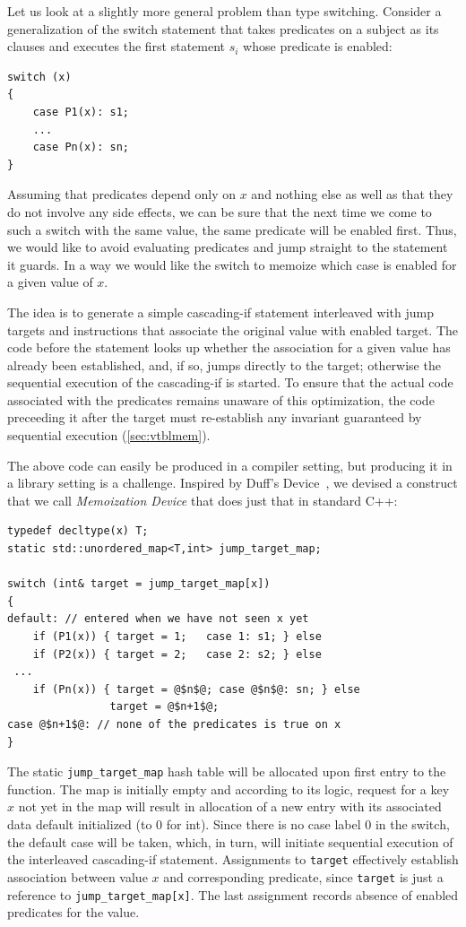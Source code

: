\documentclass[preprint]{sigplanconf}
\makeatletter
\DeclareRobustCommand{\code}[1]{{\lstinline[breaklines=false,escapechar=@]{#1}}}
\makeatother
\begin{document}
Let us look at a slightly more general problem than type switching. Consider a 
generalization of the switch statement that takes predicates on a subject as its 
clauses and executes the first statement $s_i$ whose predicate is enabled: 

\begin{lstlisting}
switch (x)
{
    case P1(x): s1;
    ...
    case Pn(x): sn;
}
\end{lstlisting}

\noindent
Assuming that predicates depend only on $x$ and nothing else as well as that 
they do not involve any side effects, we can be sure that the next time we come 
to such a switch with the same value, the same predicate will be enabled 
first. Thus, we would like to avoid evaluating predicates and jump straight to 
the statement it guards. In a way we would like the switch to  memoize which 
case is enabled for a given value of $x$.

The idea is to generate a simple cascading-if statement interleaved with jump 
targets and instructions that associate the original value with enabled target. 
The code before the statement looks up whether the association for a given value 
has already been established, and, if so, jumps directly to the target; otherwise 
the sequential execution of the cascading-if is started. To ensure 
that the actual code associated with the predicates remains unaware of this 
optimization, the code preceeding it after the target must re-establish any 
invariant guaranteed by sequential execution (\textsection\ref{sec:vtblmem}).

The above code can easily be produced in a compiler setting, but producing it in 
a library setting is a challenge. Inspired by Duff's Device~\cite{Duff}, 
we devised a construct that we call \emph{Memoization Device} that does just 
that in standard C++:

\begin{lstlisting}
typedef decltype(x) T;
static std::unordered_map<T,int> jump_target_map;

switch (int& target = jump_target_map[x])
{
default: // entered when we have not seen x yet
    if (P1(x)) { target = 1;   case 1: s1; } else 
    if (P2(x)) { target = 2;   case 2: s2; } else
 ...
    if (Pn(x)) { target = @$n$@; case @$n$@: sn; } else
                target = @$n+1$@;
case @$n+1$@: // none of the predicates is true on x
}
\end{lstlisting}

\noindent
The static \code{jump_target_map} hash table will be allocated upon first entry 
to the function. The map is initially empty and according to its logic, 
request for a key $x$ not yet in the map will result in allocation of a 
new entry with its associated data default initialized (to 0 for int). Since 
there is no case label 0 in the switch, the default case will be taken, which, in 
turn, will initiate sequential execution of the interleaved cascading-if 
statement. Assignments to \code{target} effectively establish association 
between value $x$ and corresponding predicate, since \code{target} is just a 
reference to \code{jump_target_map[x]}. The last assignment records absence of 
enabled predicates for the value.
\end{document}
